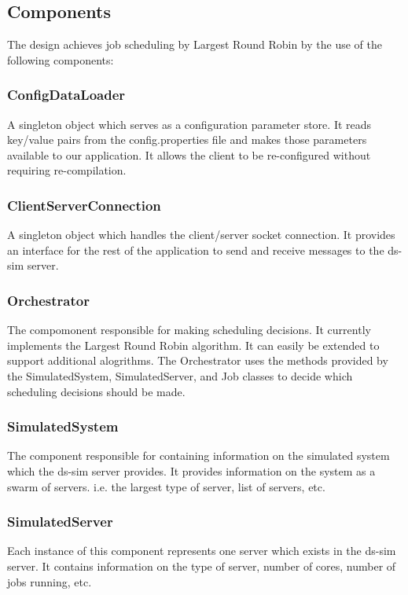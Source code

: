 \documentclass[a4paper]{article}
\begin{document}
\subsection{Components}
The design achieves job scheduling by Largest Round Robin by the use of the following components:

\subsubsection*{ConfigDataLoader}
A singleton object which serves as a configuration parameter store. It reads key/value pairs from the config.properties file and makes those parameters available to our application. It allows the client to be re-configured without requiring re-compilation.

\subsubsection*{ClientServerConnection}
A singleton object which handles the client/server socket connection. It provides an interface for the rest of the application to send and receive messages to the ds-sim server.

\subsubsection*{Orchestrator}
The compomonent responsible for making scheduling decisions. It currently implements the Largest Round Robin algorithm. It can easily be extended to support additional alogrithms. The Orchestrator uses the methods provided by the SimulatedSystem, SimulatedServer, and Job classes to decide which scheduling decisions should be made.

\subsubsection*{SimulatedSystem}
The component responsible for containing information on the simulated system which the ds-sim server provides. It provides information on the system as a swarm of servers. i.e. the largest type of server, list of servers, etc.

\subsubsection*{SimulatedServer}
Each instance of this component represents one server which exists in the ds-sim server. It contains information on the type of server, number of cores, number of jobs running, etc.
\end{document}
